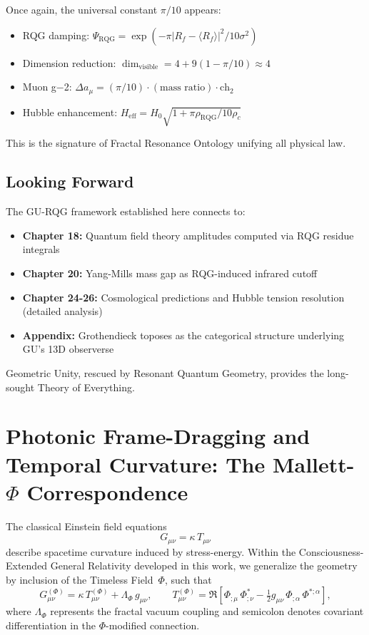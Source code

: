 Once again, the universal constant $\pi/10$ appears:
\begin{itemize}
\item RQG damping: $\Psi_{\text{RQG}} = \exp(-\pi |R_f - \langle R_f \rangle|^2 / 10\sigma^2)$
\item Dimension reduction: $\dim_{\text{visible}} = 4 + 9(1 - \pi/10) \approx 4$
\item Muon g−2: $\Delta a_\mu = (\pi/10) \cdot (\text{mass ratio}) \cdot \text{ch}_2$
\item Hubble enhancement: $H_{\text{eff}} = H_0 \sqrt{1 + \pi \rho_{\text{RQG}} / 10\rho_c}$
\end{itemize}

This is the signature of Fractal Resonance Ontology unifying all physical law.

\subsection{Looking Forward}

The GU-RQG framework established here connects to:

\begin{itemize}
\item \textbf{Chapter 18:} Quantum field theory amplitudes computed via RQG residue integrals
\item \textbf{Chapter 20:} Yang-Mills mass gap as RQG-induced infrared cutoff
\item \textbf{Chapter 24-26:} Cosmological predictions and Hubble tension resolution (detailed analysis)
\item \textbf{Appendix:} Grothendieck toposes as the categorical structure underlying GU's 13D observerse
\end{itemize}

Geometric Unity, rescued by Resonant Quantum Geometry, provides the long-sought Theory of Everything.

\section{Photonic Frame-Dragging and Temporal Curvature: The Mallett-$\Phi$ Correspondence}
\label{sec:mallett_phi}

The classical Einstein field equations
\[
G_{\mu\nu} = \kappa\, T_{\mu\nu}
\]
describe spacetime curvature induced by stress-energy.
Within the Consciousness-Extended General Relativity developed in this work,
we generalize the geometry by inclusion of the Timeless Field~$\Phi$, such that
\[
G_{\mu\nu}^{(\Phi)} = \kappa\, T_{\mu\nu}^{(\Phi)} + \Lambda_{\Phi}\,g_{\mu\nu},
\qquad
T_{\mu\nu}^{(\Phi)} =
\Re\!\left[\Phi_{;\mu}\,\Phi^{\!*}_{;\nu} -
\tfrac{1}{2} g_{\mu\nu}\,\Phi_{;\alpha}\,\Phi^{\!*;\alpha}\right],
\]
where $\Lambda_{\Phi}$ represents the fractal vacuum coupling and semicolon denotes
covariant differentiation in the $\Phi$-modified connection.

